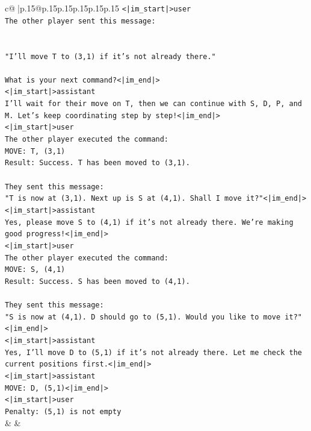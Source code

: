 \documentclass{article}
\begin{document}
{\begin{supertabular}{c@{$\;$}|p{.15\linewidth}@{}p{.15\linewidth}p{.15\linewidth}p{.15\linewidth}p{.15\linewidth}p{.15\linewidth}}
{{{\texttt{<|im\_start|>user} \\
\texttt{The other player sent this message:} \\
\\ 
\\ 
\texttt{"I'll move T to (3,1) if it's not already there."} \\
\\ 
\texttt{What is your next command?<|im\_end|>} \\
\texttt{<|im\_start|>assistant} \\
\texttt{I'll wait for their move on T, then we can continue with S, D, P, and M. Let's keep coordinating step by step!<|im\_end|>} \\
\texttt{<|im\_start|>user} \\
\texttt{The other player executed the command:} \\
\texttt{MOVE: T, (3,1)} \\
\texttt{Result: Success. T has been moved to (3,1).} \\
\\ 
\texttt{They sent this message:} \\
\texttt{"T is now at (3,1). Next up is S at (4,1). Shall I move it?"<|im\_end|>} \\
\texttt{<|im\_start|>assistant} \\
\texttt{Yes, please move S to (4,1) if it's not already there. We're making good progress!<|im\_end|>} \\
\texttt{<|im\_start|>user} \\
\texttt{The other player executed the command:} \\
\texttt{MOVE: S, (4,1)} \\
\texttt{Result: Success. S has been moved to (4,1).} \\
\\ 
\texttt{They sent this message:} \\
\texttt{"S is now at (4,1). D should go to (5,1). Would you like to move it?"<|im\_end|>} \\
\texttt{<|im\_start|>assistant} \\
\texttt{Yes, I'll move D to (5,1) if it's not already there. Let me check the current positions first.<|im\_end|>} \\
\texttt{<|im\_start|>assistant} \\
\texttt{MOVE: D, (5,1)<|im\_end|>} \\
\texttt{<|im\_start|>user} \\
\texttt{Penalty: (5,1) is not empty} \\
            }
        }
    }
    & & \\ \\


\end{supertabular}}
\end{document}
